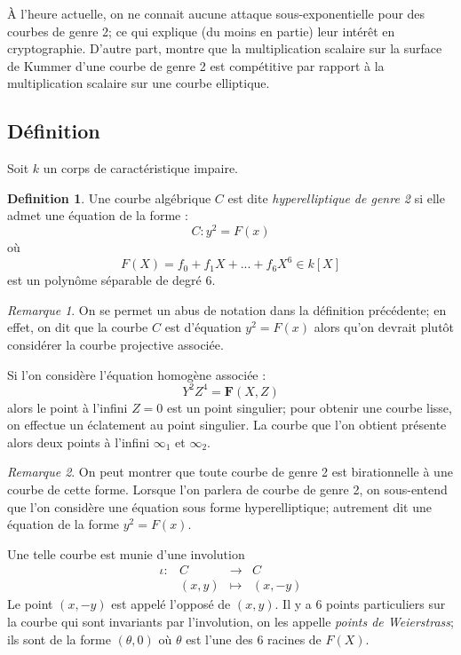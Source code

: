 \documentclass[a4paper]{article}
\theoremstyle{definition}
\newtheorem{definition}{Definition}[section]
\theoremstyle{remark}
\newtheorem{remarque}{Remarque}
\numberwithin{equation}{section}
\begin{document}
À l'heure actuelle, on ne connait aucune attaque sous-exponentielle pour des courbes de genre 2; ce qui explique (du moins en partie) leur intérêt en cryptographie.
D'autre part, \citet{gaudry} montre que la multiplication scalaire sur la surface de Kummer d'une courbe de genre 2 est compétitive par rapport à la multiplication scalaire sur une courbe elliptique.

\subsection{Définition}
Soit $k$ un corps de caractéristique impaire.

\begin{definition}
Une courbe algébrique $C$ est dite \emph{hyperelliptique de genre 2} si elle admet une équation de la forme :
$$C : y^2 = F(x)$$
où $$F(X) = f_0 + f_1X + ... + f_6X^6 \in k[X]$$
est un polynôme séparable de degré 6.
\end{definition}

\begin{remarque}
On se permet un abus de notation dans la définition précédente; en effet, on dit que la courbe $C$ est d'équation $y^2 = F(x)$ alors qu'on devrait plutôt considérer la courbe projective associée.

Si l'on considère l'équation homogène associée :
$$Y^2Z^4 = \mathbf{F}(X,Z)$$
alors le point à l'infini $Z=0$ est un point singulier; pour obtenir une courbe lisse, on effectue un éclatement au point singulier. La courbe que l'on obtient présente alors deux points à l'infini $\infty_1$ et $\infty_2$.
\end{remarque}

\begin{remarque}
On peut montrer \citep{cassels-Flynn} que toute courbe de genre 2 est birationnelle à une courbe de cette forme. Lorsque l'on parlera de courbe de genre 2, on sous-entend que l'on considère une équation sous forme hyperelliptique; autrement dit une équation de la forme $y^2 = F(x)$.
\end{remarque}

Une telle courbe est munie d'une involution 
\begin{equation*}
\begin{array}{lrcl}
\iota :&C & \longrightarrow & C \\
& (x,y) & \longmapsto & (x,-y)
\end{array}
\end{equation*}
Le point $(x,-y)$ est appelé l'opposé de $(x,y)$. Il y a 6 points particuliers sur la courbe qui sont invariants par l'involution, on les appelle \emph{points de Weierstrass}; ils sont de la forme $(\theta,0)$ où $\theta$ est l'une des 6 racines de $F(X)$.
\end{document}
